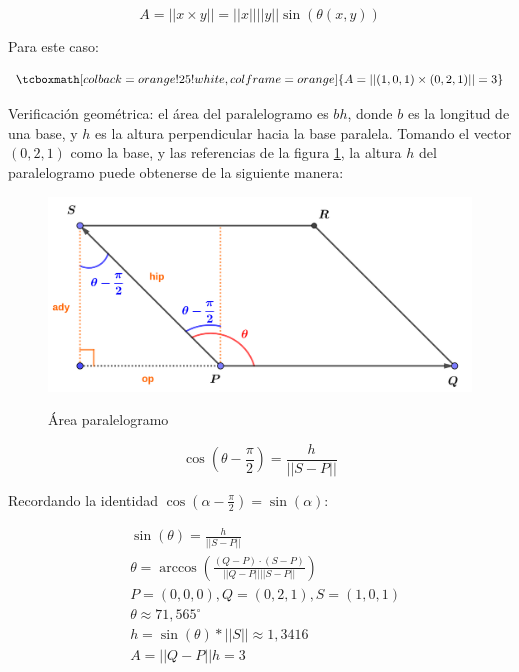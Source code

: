 \documentclass{article}
\begin{document}
\begin{enumerate}[(a)]
\begin{equation}
A = ||x \times y|| = ||x|| ||y|| \sin(\theta(x,y))
\end{equation}

Para este caso:

\begin{equation}
\tcboxmath[colback=orange!25!white,colframe=orange]
{ A = ||(1, 0, 1) \times (0, 2, 1)|| = 3 }
\end{equation}

Verificación geométrica: el área del paralelogramo es $b h$, donde $b$ es la longitud de una base, y $h$ es la altura perpendicular hacia la base paralela. Tomando el vector $(0, 2, 1)$ como la base, y las referencias de la figura \ref{fig:1-8-f}, la altura $h$ del paralelogramo puede obtenerse de la siguiente manera:

\begin{figure}[ht]
\caption{Área paralelogramo}
\includegraphics[scale=1]{img/ejercicios/1/8-f.png} 
\centering
\label{fig:1-8-f}
\end{figure}

\begin{equation}
\cos \left( \theta - \frac{\pi}{2} \right) = \frac{h}{||S-P||}
\end{equation}

Recordando la identidad $\cos(\alpha - \frac{\pi}{2}) = \sin(\alpha)$:

\begin{subequations}
\begin{align}
& \sin(\theta) = \frac{h}{||S-P||} \\
& \theta = \arccos \left( \frac{(Q-P) \cdot (S-P)}{||Q-P|| ||S-P||} \right) \\
& P = (0,0,0), Q = (0,2,1), S = (1, 0, 1) \\
& \theta \approx 71,565^{\circ} \\
& h = \sin(\theta) * ||S|| \approx 1,3416 \\
& A = ||Q-P|| h = 3
\end{align}
\end{subequations}

\end{enumerate}
\end{document}

